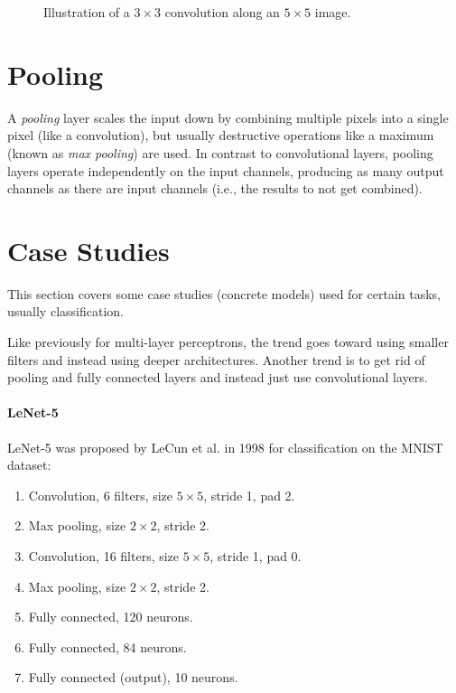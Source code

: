 \begin{figure}
		\caption{Illustration of a \( 3 \times 3 \) convolution along an \( 5 \times 5 \) image.}
		\label{fig:convNoStrideNoPadding}
	\end{figure}

	\section{Pooling}
		A \emph{pooling} layer scales the input down by combining multiple pixels into a single pixel (like a convolution), but usually destructive operations like a maximum (known as \emph{max pooling}) are used. In contrast to convolutional layers, pooling layers operate independently on the input channels, producing as many output channels as there are input channels (i.e., the results to not get combined).

	\section{Case Studies}
		This section covers some case studies (concrete models) used for certain tasks, usually classification.

		Like previously for multi-layer perceptrons, the trend goes toward using smaller filters and instead using deeper architectures. Another trend is to get rid of pooling and fully connected layers and instead just use convolutional layers.

		\paragraph{LeNet-5}
			LeNet-5 was proposed by LeCun et al. in 1998 for classification on the MNIST dataset:
			\begin{enumerate}
				\item Convolution, \num{6} filters, size \(5 \times 5\), stride \num{1}, pad \num{2}.
				\item Max pooling, size \(2 \times 2\), stride \num{2}.
				\item Convolution, \num{16} filters, size \(5 \times 5\), stride \num{1}, pad \num{0}.
				\item Max pooling, size \(2 \times 2\), stride \num{2}.
				\item Fully connected, \num{120} neurons.
				\item Fully connected, \num{84} neurons.
				\item Fully connected (output), \num{10} neurons.
			\end{enumerate}

